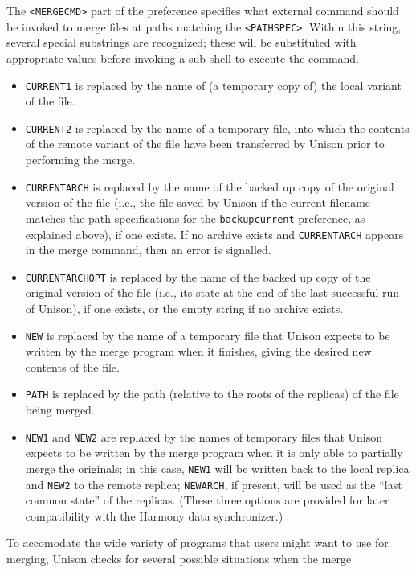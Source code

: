 \documentclass{article}
\begin{document}
The \verb|<MERGECMD>| part of the preference specifies what external command
should be invoked to merge files at paths matching the \verb|<PATHSPEC>|.
Within this string, several special substrings are recognized; these will be
substituted with appropriate values before invoking a sub-shell to execute
the command.  
\begin{itemize}
\item \relax\verb|CURRENT1| is replaced by the name of (a temporary copy of)
  the local variant of the file.
\item \relax\verb|CURRENT2| is replaced by the name of a temporary
  file, into which the contents of the remote variant of the file have
  been transferred by Unison prior to performing the merge.
\item \relax\verb|CURRENTARCH| is replaced by the name of the backed up copy
  of the original version of the file (i.e., the file saved by Unison
  if the current filename matches the path specifications for the
  \verb|backupcurrent| preference, as explained above), if one exists.
  If no archive exists and \relax\verb|CURRENTARCH| appears in the
  merge command, then an error is signalled. 
\item \relax\verb|CURRENTARCHOPT| is replaced by the name of the backed up copy
  of the original version of the file (i.e., its state at the end of
  the last successful run of Unison), if one exists, or the empty
  string if no archive exists.
\item \relax\verb|NEW| is replaced by the name of a temporary file
  that Unison expects to be written by the merge program when it
  finishes, giving the desired new contents of the file.
\item \relax\verb|PATH| is replaced by the path (relative to the roots of
  the replicas) of the file being merged.
\item \relax\verb|NEW1| and \relax\verb|NEW2| are replaced by the names of temporary files
  that Unison expects to be written by the merge program when it
  is only able to partially merge the originals; in this case, \verb|NEW1|
  will be written back to the local replica and \verb|NEW2| to the remote
  replica; \verb|NEWARCH|, if present, will be used as the ``last common
  state'' of the replicas.  (These three options are provided for
  later compatibility with the Harmony data synchronizer.)
\end{itemize}
To accomodate the wide variety of programs that users might want to use for
merging, Unison checks for several possible situations when the merge
\end{document}
